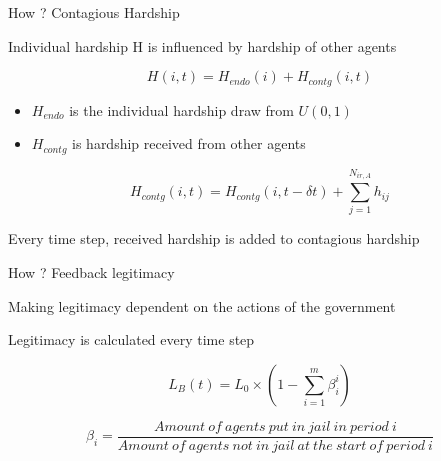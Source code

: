 \documentclass[10pt]{beamer}
\begin{document}
    \begin{frame}{How ? Contagious Hardship}

        Individual hardship H is influenced by hardship of other agents

        \begin{equation}
            H(i,t) = H_{endo}(i) + H_{contg}(i,t)
        \end{equation}

        \begin{itemize}
            \item $H_{endo}$ is the individual hardship draw from $U(0, 1)$
            \item $H_{contg}$ is hardship received from other agents
        \end{itemize}

        \begin{equation}
            H_{contg}(i,t) =H_{contg}(i,t - \delta t) + \sum\limits_{j = 1}^{N_{ir, A}} h_{ij}
        \end{equation}

        Every time step, received hardship is added to contagious hardship


    \end{frame}

    \begin{frame}{How ? Feedback legitimacy}

        Making legitimacy dependent on the actions of the government

        Legitimacy is calculated every time step

        \begin{equation}
            L_B(t) = L_0 \times (1- \sum\limits_{i = 1}^{m} \beta^i_i)
        \end{equation}

        \begin{equation}
            \beta_i = \frac{Amount\ of\ agents\ put\ in\ jail\ in\ period\ i}{Amount\ of\ agents\ not\ in\ jail\ at\ the\ start\ of\ period\ i}
        \end{equation}

    \end{frame}
\end{document}
